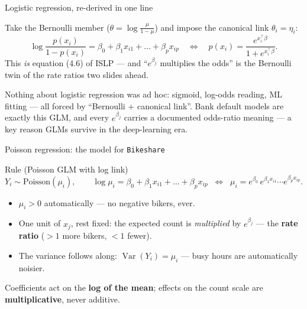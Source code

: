 \documentclass[aspectratio=169,11pt]{beamer}
\begin{document}
\begin{frame}{Logistic regression, re-derived in one line}
  \footnotesize
  \begin{numexample}
    Take the Bernoulli member ($\theta=\log\frac{\mu}{1-\mu}$) and impose the
    canonical link $\theta_i = \eta_i$:
    \[
      \log\frac{p(x_i)}{1-p(x_i)} = \beta_0 + \beta_1 x_{i1} + \dots + \beta_p x_{ip}
      \quad\Longleftrightarrow\quad
      p(x_i) = \frac{e^{x_i^{\top}\beta}}{1+e^{x_i^{\top}\beta}} .
    \]
    This \emph{is} equation (4.6) of ISLP --- and ``$e^{\beta_j}$ multiplies the
    odds'' is the Bernoulli twin of the rate ratios two slides ahead.
  \end{numexample}
  \begin{takeaway}
    Nothing about logistic regression was ad hoc: sigmoid, log-odds reading, ML
    fitting --- all forced by ``Bernoulli $+$ canonical link''. Bank default models are
    exactly this GLM, and every $e^{\beta_j}$ carries a documented odds-ratio meaning ---
    a key reason GLMs survive in the deep-learning era.
  \end{takeaway}
\end{frame}

\begin{frame}{Poisson regression: the model for \texttt{Bikeshare}}
  \begin{block}{Rule (Poisson GLM with log link)}
    \[
      Y_i \sim \text{Poisson}(\mu_i), \qquad
      \log \mu_i = \beta_0 + \beta_1 x_{i1} + \dots + \beta_p x_{ip}
      \;\;\Longleftrightarrow\;\;
      \mu_i = e^{\beta_0}\, e^{\beta_1 x_{i1}} \cdots e^{\beta_p x_{ip}} .
    \]
  \end{block}
  \begin{readme}
    \begin{itemize}
      \item $\mu_i > 0$ automatically --- no negative bikers, ever.
      \item One unit of $x_j$, rest fixed: the expected count is \emph{multiplied} by
            $e^{\beta_j}$ --- the \textbf{rate ratio} ($>1$ more bikers, $<1$ fewer).
      \item The variance follows along: $\operatorname{Var}(Y_i)=\mu_i$ --- busy hours
            are automatically noisier.
    \end{itemize}
  \end{readme}
  \begin{takeaway}
    Coefficients act on the \textbf{log of the mean}; effects on the count scale are
    \textbf{multiplicative}, never additive.
  \end{takeaway}
\end{frame}
\end{document}
